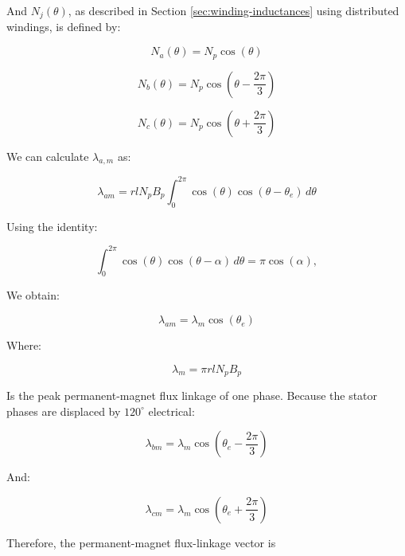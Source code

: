 \documentclass{article}
\begin{document}
And $N_j(\theta)$, as described in Section \ref{sec:winding-inductances} using distributed windings, is defined by:

\begin{equation}
    N_a(\theta) = N_p \cos(\theta)
\end{equation}

\begin{equation}
    N_b(\theta) = N_p \cos\left(\theta-\frac{2\pi}{3}\right)
\end{equation}

\begin{equation}
    N_c(\theta) = N_p \cos\left(\theta+\frac{2\pi}{3}\right)
\end{equation}

We can calculate $\lambda_{a,m}$ as:

\begin{equation}
    \lambda_{am} = rlN_p B_{p} \int_0^{2\pi} \cos(\theta)\cos(\theta-\theta_e)\,d\theta
\end{equation}

Using the identity:

\begin{equation}
    \int_0^{2\pi} \cos(\theta)\cos(\theta-\alpha)\,d\theta = \pi\cos(\alpha),
\end{equation}

We obtain:

\begin{equation}
    \lambda_{am} = \lambda_m\cos(\theta_e)
\end{equation}

Where:

\begin{equation}
    \lambda_m = \pi r l N_p B_p
\end{equation}

Is the peak permanent-magnet flux linkage of one phase. Because the stator phases are displaced by $120^\circ$ electrical:

\begin{equation}
    \lambda_{bm} = \lambda_m \cos\left(\theta_e-\frac{2\pi}{3}\right)
\end{equation}

And:

\begin{equation}
    \lambda_{cm} = \lambda_m \cos\left(\theta_e+\frac{2\pi}{3}\right)
\end{equation}

Therefore, the permanent-magnet flux-linkage vector is
\end{document}
